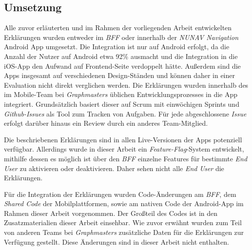 \subsection{Umsetzung}

Alle zuvor erläuterten und im Rahmen der vorliegenden Arbeit entwickelten Erklärungen wurden entweder im \textit{BFF} oder innerhalb der \textit{NUNAV Navigation} Android App umgesetzt. Die Integration ist nur auf Android erfolgt, da die Anzahl der Nutzer auf Android etwa 92\% ausmacht und die Integration in die iOS-App den Aufwand auf Frontend-Seite verdoppelt hätte. Außerdem sind die Apps insgesamt auf verschiedenen Design-Ständen und können daher in einer Evaluation nicht direkt verglichen werden. Die Erklärungen wurden innerhalb des im Mobile-Team bei \textit{Graphmasters} üblichen Entwicklungsprozesses in die App integriert. Grundsätzlich basiert dieser auf Scrum mit einwöchigen Sprints und \textit{Github-Issues} als Tool zum Tracken von Aufgaben. Für jede abgeschlossene \textit{Issue} erfolgt darüber hinaus ein Review durch ein anderes Team-Mitglied.

Die beschriebenen Erklärungen sind in allen Live-Versionen der Apps potenziell verfügbar. Allerdings wurde in dieser Arbeit ein \textit{Feature-Flag}-System entwickelt, mithilfe dessen es möglich ist über den \textit{BFF} einzelne Features für bestimmte \textit{End User} zu aktivieren oder deaktivieren. Daher sehen nicht alle \textit{End User} die Erklärungen.

Für die Integration der Erklärungen wurden Code-Änderungen am \textit{BFF}, dem \textit{Shared Code} der Mobilplattformen, sowie am nativen Code der Android-App im Rahmen dieser Arbeit vorgenommen. Der Großteil des Codes ist in den Zusatzmaterialien dieser Arbeit einsehbar. Wie zuvor erwähnt wurden zum Teil von anderen Teams bei \textit{Graphmasters} zusätzliche Daten für die Erklärungen zur Verfügung gestellt. Diese Änderungen sind in dieser Arbeit nicht enthalten.

\newpage